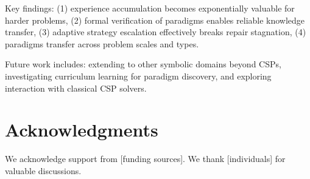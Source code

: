 \documentclass[letterpaper]{article}
\begin{document}
Key findings: (1) experience accumulation becomes exponentially valuable for harder problems, (2) formal verification of paradigms enables reliable knowledge transfer, (3) adaptive strategy escalation effectively breaks repair stagnation, (4) paradigms transfer across problem scales and types.

Future work includes: extending to other symbolic domains beyond CSPs, investigating curriculum learning for paradigm discovery, and exploring interaction with classical CSP solvers.

\section*{Acknowledgments}

We acknowledge support from [funding sources]. We thank [individuals] for valuable discussions.



\end{document}
